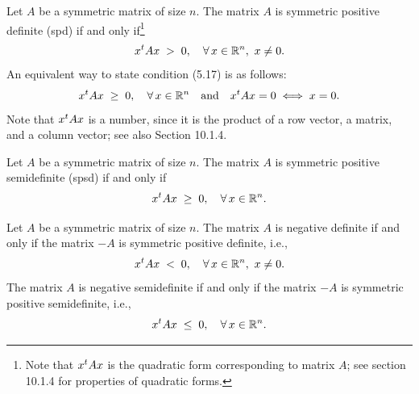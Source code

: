\begin{definition}
Let $A$ be a symmetric matrix of size $n$. The matrix $A$ is symmetric positive
definite (spd) if and only if\footnote{Note that $x^{t} Ax$ is the quadratic form
corresponding to matrix $A$; see section 10.1.4 for properties of quadratic forms.}
\begin{equation}
x^{t} Ax \;>\; 0, \quad \forall\, x \in \mathbb{R}^n,\ x \neq 0.
\end{equation}
An equivalent way to state condition (5.17) is as follows:
\begin{equation}
x^{t} Ax \;\geq\; 0, \quad \forall\, x \in \mathbb{R}^n \quad \text{and} \quad x^{t} Ax = 0
\iff x = 0.
\end{equation}
Note that $x^{t} Ax$ is a number, since it is the product of a row vector, a matrix, and
a column vector; see also Section 10.1.4.
\end{definition}

\begin{definition}
Let $A$ be a symmetric matrix of size $n$. The matrix $A$ is symmetric positive
semidefinite (spsd) if and only if
\begin{equation}
x^{t} Ax \;\geq\; 0, \quad \forall\, x \in \mathbb{R}^n.
\end{equation}
\end{definition}

\begin{definition}
Let $A$ be a symmetric matrix of size $n$. The matrix $A$ is negative definite if and
only if the matrix $-A$ is symmetric positive definite, i.e.,
\[
x^{t} Ax \;<\; 0, \quad \forall\, x \in \mathbb{R}^n,\ x \neq 0.
\]
The matrix $A$ is negative semidefinite if and only if the matrix $-A$ is symmetric
positive semidefinite, i.e.,
\[
x^{t} Ax \;\leq\; 0, \quad \forall\, x \in \mathbb{R}^n.
\]
\end{definition}
